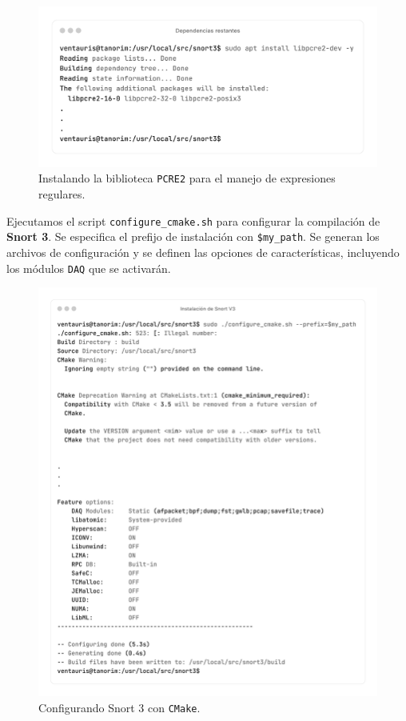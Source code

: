 \documentclass[12pt,a4paper]{report}
\begin{document}
\begin{figure}[H]
	\centering
	\includegraphics[scale=0.12]{instalacion_snort/20-20.png}
	\caption{Instalando la biblioteca \texttt{PCRE2} para el manejo de expresiones regulares.}
\end{figure}

\newpage

Ejecutamos el script \texttt{configure\_cmake.sh} para configurar la compilación de \textbf{Snort 3}. Se especifica el prefijo de instalación con \texttt{\$my\_path}. Se generan los archivos de configuración y se definen las opciones de características, incluyendo los módulos \texttt{DAQ} que se activarán.

\begin{figure}[H]
	\centering
	\includegraphics[scale=0.12]{instalacion_snort/21-21.png}
	\caption{Configurando Snort 3 con \texttt{CMake}.}
\end{figure}
\end{document}
